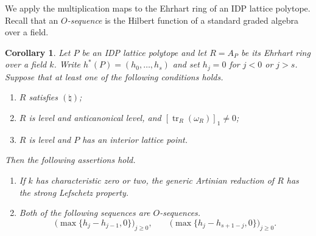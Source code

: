 \documentclass[a4paper,11pt]{amsart}
\DeclareMathOperator{\tr}{tr}
\newcommand{\kk}{k}
\newcommand{\natur}{\natural}
\newtheorem{corollary}[theorem]{Corollary}
\theoremstyle{definition}
\begin{document}
We apply the multiplication maps to the Ehrhart ring of an IDP lattice polytope. Recall that an \emph{$O$-sequence} is the Hilbert function of a standard graded algebra over a field.

\begin{corollary}\label{cor:ehrhart-consequences}
Let $P$ be an IDP lattice polytope and let $R=A_P$ be its Ehrhart ring over a field $\kk$. Write $h^*(P)=(h_0,\ldots,h_s)$ and set $h_j=0$ for $j<0$ or $j>s$. Suppose that at least one of the following conditions holds.
\begin{enumerate}
\item $R$ satisfies $(\natur)$;
\item $R$ is level and anticanonical level, and $[\tr_R(\omega_R)]_1\ne0$;
\item $R$ is level and $P$ has an interior lattice point.
\end{enumerate}
Then the following assertions hold.
\begin{enumerate}
\renewcommand{\theenumi}{\alph{enumi}}
\renewcommand{\labelenumi}{\textup{(\theenumi)}}
\item\label{item:ehrhart-lefschetz} If $\kk$ has characteristic zero or two, the generic Artinian reduction of $R$ has the strong Lefschetz property.
\item\label{item:ehrhart-osequences} Both of the following sequences are $O$-sequences.
\[
 \bigl(\max\{h_j-h_{j-1},0\}\bigr)_{j\ge0},\qquad
 \bigl(\max\{h_j-h_{s+1-j},0\}\bigr)_{j\ge0}.
\]
\end{enumerate}
\end{corollary}
\end{document}
